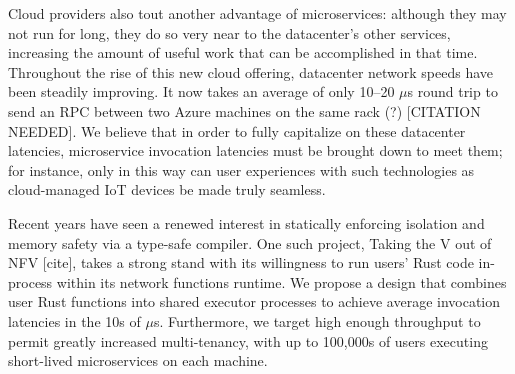 Cloud providers also tout another advantage of microservices: although they may not run for long, they do so very near to the datacenter's other services, increasing the amount of useful work that can be accomplished in that time.
Throughout the rise of this new cloud offering, datacenter network speeds have been steadily improving.
It now takes an average of only 10--20 $\mu$s round trip to send an RPC between two Azure machines on the same rack (?) [CITATION NEEDED].
We believe that in order to fully capitalize on these datacenter latencies, microservice invocation latencies must be brought down to meet them; for instance, only in this way can user experiences with such technologies as cloud-managed IoT devices be made truly seamless.

Recent years have seen a renewed interest in statically enforcing isolation and memory safety via a type-safe compiler.
One such project, Taking the V out of NFV [cite], takes a strong stand with its willingness to run users' Rust code in-process within its network functions runtime.
We propose a design that combines user Rust functions into shared executor processes to achieve average invocation latencies in the 10s of $\mu$s.
Furthermore, we target high enough throughput to permit greatly increased multi-tenancy, with up to 100,000s of users executing short-lived microservices on each machine.
